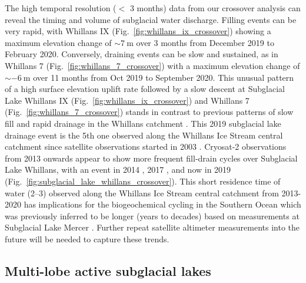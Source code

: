 The high temporal resolution ($<$ 3 months) data from our crossover analysis can reveal the timing and volume of subglacial water discharge. %
Filling events can be very rapid, with Whillans IX (Fig.~\ref{fig:whillans_ix_crossover}) showing a maximum elevation change of $\sim\SI{+7}{\metre}$ over 3 months from December 2019 to February 2020.
Conversely, draining events can be slow and sustained, as in Whillans 7 (Fig.~\ref{fig:whillans_7_crossover}) with a maximum elevation change of $\sim\SI{-6}{\metre}$ over 11 months from Oct 2019 to September 2020.
This unusual pattern of a high surface elevation uplift rate followed by a slow descent at Subglacial Lake Whillans IX (Fig.~\ref{fig:whillans_ix_crossover}) and Whillans 7 (Fig.~\ref{fig:whillans_7_crossover}) stands in contrast to previous patterns of slow fill and rapid drainage in the Whillans catchment \citep[e.g.][]{SiegfriedEpisodicicevelocity2016,SiegfriedThirteenyearssubglacial2018}.
This 2019 subglacial lake drainage event is the 5th one observed along the Whillans Ice Stream central catchment since satellite observations started in 2003 \citep{SiegfriedThirteenyearssubglacial2018}.
Cryosat-2 observations from 2013 onwards appear to show more frequent fill-drain cycles over Subglacial Lake Whillans, with an event in 2014 \citep{SiegfriedEpisodicicevelocity2016}, 2017 \citep{SiegfriedThirteenyearssubglacial2018}, and now in 2019 (Fig.~\ref{fig:subglacial_lake_whillans_crossover}).
This short residence time of water (\SIrange{2}{3}{\year}) observed along the Whillans Ice Stream central catchment from 2013-2020 has implications for the biogeochemical cycling in the Southern Ocean which was previously inferred to be longer (years to decades) based on measurements at Subglacial Lake Mercer \citep{Vick-MajorsBiogeochemicalConnectivityFreshwater2020,HawkingsEnhancedtraceelement2020}.
Further repeat satellite altimeter measurements into the future \citep[e.g. CRISTAL;][]{KernCopernicusPolarIce2020} will be needed to capture these trends.


\subsection{Multi-lobe active subglacial lakes}

